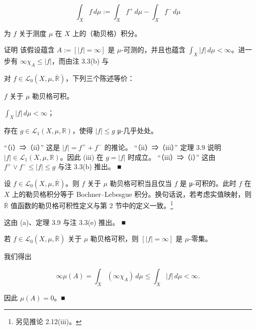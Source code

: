 \[
\int_X f\,d\mu := \int_X f^+\,d\mu - \int_X f^-\,d\mu
\]

为 $ f $ 关于测度 $ \mu $ 在 $ X $ 上的（勒贝格）积分。

\begin{remark}

证明 该假设蕴含 $ A := [|f| = \infty] $ 是 $ \mu $-可测的，并且也蕴含 $ \int_X |f| \, d\mu < \infty $。进一步有 $ \infty\chi_A \le |f| $，而由注 3.3(b) 与

\begin{items}
\item

对 $ f \in \mathcal{L}_0(X,\mu,\overline{\mathbb{R}}) $，下列三个陈述等价：

\begin{subitems}
\item

$ f $ 关于 $ \mu $ 勒贝格可积。

\item

$ \int_X |f|\,d\mu < \infty $；

\item

存在 $ g \in \mathcal{L}_1(X,\mu,\mathbb{R}) $，使得 $ |f| \le g $ μ-几乎处处。

\proofhead
“（i）⇒（ii）” 这是 $ |f| = f^+ + f^- $ 的推论。
“（ii）⇒（iii）” 定理 3.9 说明 $ |f| \in \mathcal{L}_1(X,\mu,\mathbb{R}) $。因此 (iii) 在 $ g = |f| $ 时成立。
“（iii）⇒（i）” 这由 $ f^+ \vee f^- \le |f| \le g $ 与注 3.3(b) 推出。 \nobreak\hspace{0.35em}■
\end{subitems}

\item

设 $ f \in \mathcal{L}_0(X,\mu,\overline{\mathbb{R}}) $。则 $ f $ 关于 $ \mu $ 勒贝格可积当且仅当 $ f $ 是 μ-可积的。此时 $ f $ 在 $ X $ 上的勒贝格积分等于 Bochner–Lebesgue 积分。换句话说，若考虑实值映射，则 $ \overline{\mathbb{R}} $ 值函数的勒贝格可积性定义与第 2 节中的定义一致。\footnote{另见推论 2.12(iii)。}

\proofhead
这由 (a)、定理 3.9 与注 3.3(e) 推出。 \nobreak\hspace{0.35em}■
\item

若 $ f \in \mathcal{L}_0(X,\mu,\overline{\mathbb{R}}) $ 关于 $ \mu $ 勒贝格可积，则 $ [|f| = \infty] $ 是 $ \mu $-零集。

\item

我们得出

\[
\infty\mu(A) = \int_X (\infty\chi_A) \, d\mu \le \int_X |f| \, d\mu < \infty.
\]

因此 $ \mu(A) = 0 $。\nobreak\hspace{0.35em}■

\end{items}

\end{remark}

